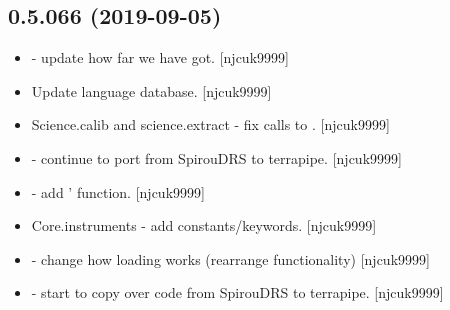 \documentclass[a4paper,10pt,english]{report}
\begin{document}
\subsection{0.5.066 (2019-09-05)}
\label{\detokenize{misc/changelog:id77}}\begin{itemize}
\item {} 
 - update how far we have got. {[}njcuk9999{]}

\item {} 
Update language database. {[}njcuk9999{]}

\item {} 
Science.calib and science.extract - fix calls to .
{[}njcuk9999{]}

\item {} 
 - continue to port from SpirouDRS to
terrapipe. {[}njcuk9999{]}

\item {} 
 - add ’ function. {[}njcuk9999{]}

\item {} 
Core.instruments - add  constants/keywords. {[}njcuk9999{]}

\item {} 
 - change how loading works (rearrange
functionality) {[}njcuk9999{]}

\item {} 
 - start to copy over code from SpirouDRS to
terrapipe. {[}njcuk9999{]}

\end{itemize}
\end{document}
